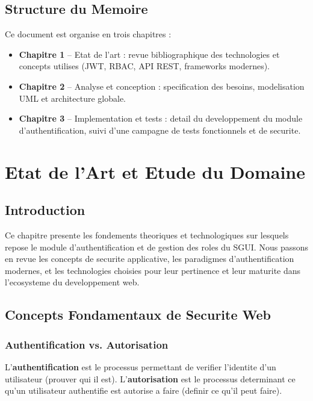 \documentclass[12pt,a4paper]{report}
\begin{document}
\section*{Structure du Memoire}

Ce document est organise en trois chapitres :
\begin{itemize}
  \item \textbf{Chapitre 1} -- Etat de l'art : revue bibliographique des
        technologies et concepts utilises (JWT, RBAC, API REST,
        frameworks modernes).
  \item \textbf{Chapitre 2} -- Analyse et conception : specification des
        besoins, modelisation UML et architecture globale.
  \item \textbf{Chapitre 3} -- Implementation et tests : detail du
        developpement du module d'authentification, suivi d'une campagne
        de tests fonctionnels et de securite.
\end{itemize}

\chapter{Etat de l'Art et Etude du Domaine}

\section{Introduction}

Ce chapitre presente les fondements theoriques et technologiques sur
lesquels repose le module d'authentification et de gestion des roles du
SGUI. Nous passons en revue les concepts de securite applicative, les
paradigmes d'authentification modernes, et les technologies choisies pour
leur pertinence et leur maturite dans l'ecosysteme du developpement web.

\section{Concepts Fondamentaux de Securite Web}

\subsection{Authentification vs. Autorisation}

L'\textbf{authentification} est le processus permettant de verifier
l'identite d'un utilisateur (prouver qui il est). L'\textbf{autorisation}
est le processus determinant ce qu'un utilisateur authentifie est
autorise a faire (definir ce qu'il peut faire).
\end{document}
